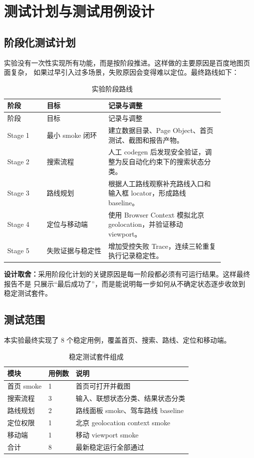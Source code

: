 \documentclass[UTF8,a4paper,12pt]{ctexart}
\newcommand{\decision}[1]{\par\noindent\textbf{设计取舍：}#1\par}
\begin{document}
\section{测试计划与测试用例设计}

\subsection{阶段化测试计划}

实验没有一次性实现所有功能，而是按阶段推进。这样做的主要原因是百度地图页面复杂，
如果过早引入过多场景，失败原因会变得难以定位。最终路线如下：

\begin{longtable}{p{0.16\linewidth}p{0.25\linewidth}p{0.47\linewidth}}
\caption{实验阶段路线} \\
\toprule
阶段 & 目标 & 记录与调整 \\
\midrule
\endfirsthead
\toprule
阶段 & 目标 & 记录与调整 \\
\midrule
\endhead
Stage 1 & 最小 smoke 闭环 & 建立数据目录、Page Object、首页测试、截图和报告产物。 \\
Stage 2 & 搜索流程 & 人工 codegen 后发现安全验证，调整为反自动化约束下的搜索状态分类。 \\
Stage 3 & 路线规划 & 根据人工路线观察补充路线入口和输入框 locator，形成路线 baseline。 \\
Stage 4 & 定位与移动端 & 使用 Browser Context 模拟北京 geolocation，并验证移动 viewport。 \\
Stage 5 & 失败证据与稳定性 & 增加受控失败 Trace，连续三轮重复执行记录稳定性。 \\
\bottomrule
\end{longtable}

\decision{采用阶段化计划的关键原因是每一阶段都必须有可运行结果。这样最终报告不是
只展示“最后成功了”，而是能说明每一步如何从不确定状态逐步收敛到稳定测试套件。}

\subsection{测试范围}

本实验最终实现了 8 个稳定用例，覆盖首页、搜索、路线、定位和移动端。

\begin{table}[H]
\centering
\caption{稳定测试套件组成}
\begin{tabular}{lll}
\toprule
模块 & 用例数 & 说明 \\
\midrule
首页 smoke & 1 & 首页可打开并截图 \\
搜索流程 & 3 & 输入、联想状态分类、结果状态分类 \\
路线规划 & 2 & 路线面板 smoke、驾车路线 baseline \\
定位权限 & 1 & 北京 geolocation context smoke \\
移动端 & 1 & 移动 viewport smoke \\
\midrule
合计 & 8 & 最新稳定运行全部通过 \\
\bottomrule
\end{tabular}
\end{table}
\end{document}
